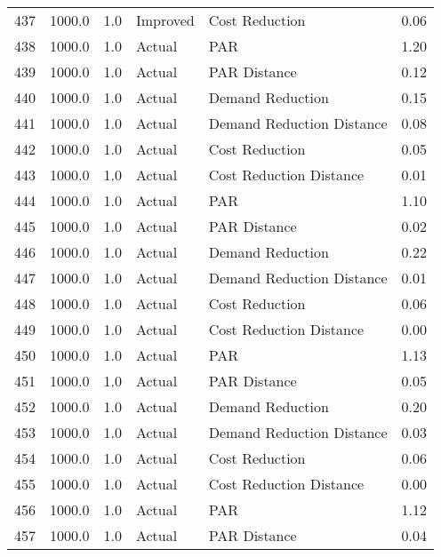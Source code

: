 \begin{longtable}{lrrllr}
437  &       1000.0 &     1.0 &       Improved &             Cost Reduction &   0.06 \\
438  &       1000.0 &     1.0 &         Actual &                        PAR &   1.20 \\
439  &       1000.0 &     1.0 &         Actual &               PAR Distance &   0.12 \\
440  &       1000.0 &     1.0 &         Actual &           Demand Reduction &   0.15 \\
441  &       1000.0 &     1.0 &         Actual &  Demand Reduction Distance &   0.08 \\
442  &       1000.0 &     1.0 &         Actual &             Cost Reduction &   0.05 \\
443  &       1000.0 &     1.0 &         Actual &    Cost Reduction Distance &   0.01 \\
444  &       1000.0 &     1.0 &         Actual &                        PAR &   1.10 \\
445  &       1000.0 &     1.0 &         Actual &               PAR Distance &   0.02 \\
446  &       1000.0 &     1.0 &         Actual &           Demand Reduction &   0.22 \\
447  &       1000.0 &     1.0 &         Actual &  Demand Reduction Distance &   0.01 \\
448  &       1000.0 &     1.0 &         Actual &             Cost Reduction &   0.06 \\
449  &       1000.0 &     1.0 &         Actual &    Cost Reduction Distance &   0.00 \\
450  &       1000.0 &     1.0 &         Actual &                        PAR &   1.13 \\
451  &       1000.0 &     1.0 &         Actual &               PAR Distance &   0.05 \\
452  &       1000.0 &     1.0 &         Actual &           Demand Reduction &   0.20 \\
453  &       1000.0 &     1.0 &         Actual &  Demand Reduction Distance &   0.03 \\
454  &       1000.0 &     1.0 &         Actual &             Cost Reduction &   0.06 \\
455  &       1000.0 &     1.0 &         Actual &    Cost Reduction Distance &   0.00 \\
456  &       1000.0 &     1.0 &         Actual &                        PAR &   1.12 \\
457  &       1000.0 &     1.0 &         Actual &               PAR Distance &   0.04 \\

\end{longtable}
